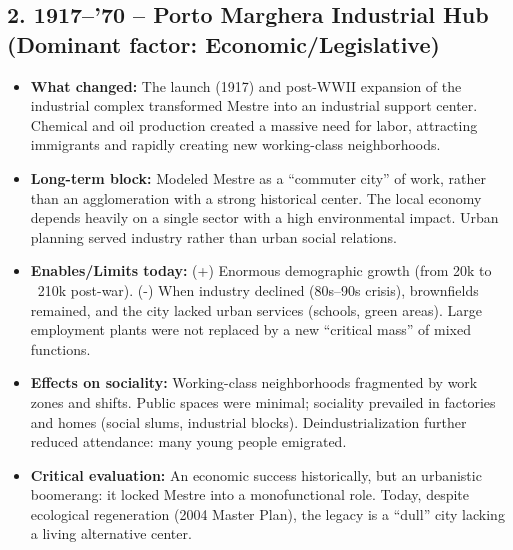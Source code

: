 \documentclass[a4paper,11pt]{article}
\begin{document}
\subsection*{2. 1917--'70 – Porto Marghera Industrial Hub (Dominant factor: Economic/Legislative)}
\begin{itemize}
    \item \textbf{What changed:} The launch (1917) and post-WWII expansion of the industrial complex transformed Mestre into an industrial support center. Chemical and oil production created a massive need for labor, attracting immigrants and rapidly creating new working-class neighborhoods.
    \item \textbf{Long-term block:} Modeled Mestre as a ``commuter city'' of work, rather than an agglomeration with a strong historical center. The local economy depends heavily on a single sector with a high environmental impact. Urban planning served industry rather than urban social relations.
    \item \textbf{Enables/Limits today:} (+) Enormous demographic growth (from 20k to ~210k post-war). (-) When industry declined (80s--90s crisis), brownfields remained, and the city lacked urban services (schools, green areas). Large employment plants were not replaced by a new ``critical mass'' of mixed functions.
    \item \textbf{Effects on sociality:} Working-class neighborhoods fragmented by work zones and shifts. Public spaces were minimal; sociality prevailed in factories and homes (social slums, industrial blocks). Deindustrialization further reduced attendance: many young people emigrated.
    \item \textbf{Critical evaluation:} An economic success historically, but an urbanistic boomerang: it locked Mestre into a monofunctional role. Today, despite ecological regeneration (2004 Master Plan), the legacy is a ``dull'' city lacking a living alternative center.
\end{itemize}
\end{document}
